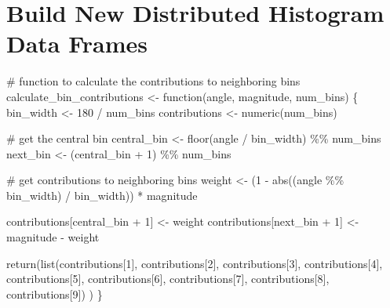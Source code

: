 \documentclass[
  letterpaper,
  DIV=11,
  numbers=noendperiod]{scrreprt}
\newenvironment{Shaded}{\begin{snugshade}}{\end{snugshade}}
\newcommand{\CommentTok}[1]{\textcolor[rgb]{0.37,0.37,0.37}{#1}}
\newcommand{\ControlFlowTok}[1]{\textcolor[rgb]{0.00,0.23,0.31}{#1}}
\newcommand{\DecValTok}[1]{\textcolor[rgb]{0.68,0.00,0.00}{#1}}
\newcommand{\FunctionTok}[1]{\textcolor[rgb]{0.28,0.35,0.67}{#1}}
\newcommand{\NormalTok}[1]{\textcolor[rgb]{0.00,0.23,0.31}{#1}}
\newcommand{\OtherTok}[1]{\textcolor[rgb]{0.00,0.23,0.31}{#1}}
\newcommand{\SpecialCharTok}[1]{\textcolor[rgb]{0.37,0.37,0.37}{#1}}
\begin{document}
\section{Build New Distributed Histogram Data
Frames}\label{build-new-distributed-histogram-data-frames}

\begin{Shaded}
\begin{Highlighting}[]
\CommentTok{\# function to calculate the contributions to neighboring bins}
\NormalTok{calculate\_bin\_contributions }\OtherTok{\textless{}{-}} \ControlFlowTok{function}\NormalTok{(angle, magnitude, num\_bins) \{}
\NormalTok{  bin\_width }\OtherTok{\textless{}{-}} \DecValTok{180} \SpecialCharTok{/}\NormalTok{ num\_bins}
\NormalTok{  contributions }\OtherTok{\textless{}{-}} \FunctionTok{numeric}\NormalTok{(num\_bins)}
  
  \CommentTok{\# get the central bin}
\NormalTok{  central\_bin }\OtherTok{\textless{}{-}} \FunctionTok{floor}\NormalTok{(angle }\SpecialCharTok{/}\NormalTok{ bin\_width) }\SpecialCharTok{\%\%}\NormalTok{ num\_bins}
\NormalTok{  next\_bin }\OtherTok{\textless{}{-}}\NormalTok{ (central\_bin }\SpecialCharTok{+} \DecValTok{1}\NormalTok{) }\SpecialCharTok{\%\%}\NormalTok{ num\_bins}
  
  \CommentTok{\# get contributions to neighboring bins}
\NormalTok{  weight }\OtherTok{\textless{}{-}}\NormalTok{ (}\DecValTok{1} \SpecialCharTok{{-}} \FunctionTok{abs}\NormalTok{((angle }\SpecialCharTok{\%\%}\NormalTok{ bin\_width) }\SpecialCharTok{/}\NormalTok{ bin\_width)) }\SpecialCharTok{*}\NormalTok{ magnitude}
  
\NormalTok{  contributions[central\_bin }\SpecialCharTok{+} \DecValTok{1}\NormalTok{] }\OtherTok{\textless{}{-}}\NormalTok{ weight}
\NormalTok{  contributions[next\_bin }\SpecialCharTok{+} \DecValTok{1}\NormalTok{] }\OtherTok{\textless{}{-}}\NormalTok{ magnitude }\SpecialCharTok{{-}}\NormalTok{ weight}
  
  \FunctionTok{return}\NormalTok{(}\FunctionTok{list}\NormalTok{(contributions[}\DecValTok{1}\NormalTok{],}
\NormalTok{         contributions[}\DecValTok{2}\NormalTok{],}
\NormalTok{         contributions[}\DecValTok{3}\NormalTok{],}
\NormalTok{         contributions[}\DecValTok{4}\NormalTok{],}
\NormalTok{         contributions[}\DecValTok{5}\NormalTok{],}
\NormalTok{         contributions[}\DecValTok{6}\NormalTok{],}
\NormalTok{         contributions[}\DecValTok{7}\NormalTok{],}
\NormalTok{         contributions[}\DecValTok{8}\NormalTok{],}
\NormalTok{         contributions[}\DecValTok{9}\NormalTok{])}
\NormalTok{         )}
\NormalTok{\}}
\end{Highlighting}
\end{Shaded}
\end{document}
